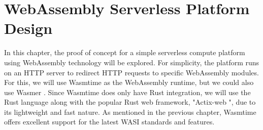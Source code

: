 \chapter{WebAssembly Serverless Platform Design}
\label{chap:poc}

In this chapter, the proof of concept for a simple \gls{serverless} compute platform using WebAssembly technology will be explored. For simplicity, the platform runs on an HTTP server to redirect HTTP requests to specific WebAssembly modules. For this, we will use Wasmtime \cite{bytecodealliance_2022_wasmtime} as the WebAssembly runtime, but we could also use Wasmer \cite{wasmerinc_2023_wasmer}. Since Wasmtime does only have Rust integration, we will use the Rust language along with the popular Rust web framework, "Actix-web \cite{actixteam_actix}", due to its lightweight and fast nature. As mentioned in the previous chapter, Wasmtime offers excellent support for the latest WASI standards and features. 

